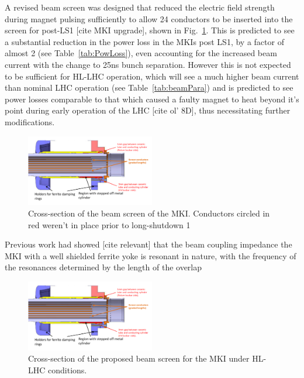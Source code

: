 \documentclass[a4paper,
              ]{jacow}
\begin{document}
A revised beam screen was designed that reduced the electric field strength during magnet pulsing sufficiently to allow 24 conductors to be inserted into the screen for post-LS1 [cite MKI upgrade], shown in Fig.~\ref{fig:BeamScreenPostLS1}. This is predicted to see a substantial reduction in the power loss in the MKIs post LS1, by a factor of almost 2 (see Table~\ref{tab:PowLoss}), even accounting for the increased beam current with the change to 25ns bunch separation. However this is not expected to be sufficient for HL-LHC operation, which will see a much higher beam current than nominal LHC operation (see Table~\ref{tab:beamPara}) and is predicted to see power losses comparable to that which caused a faulty magnet to heat beyond it's point during early operation of the LHC [cite ol' 8D], thus necessitating further modifications.

\begin{figure}
\begin{center}
\includegraphics[width=0.5\textwidth]{beamScreenCrossSectionLabelled.pdf}
\caption{Cross-section of the beam screen of the MKI. Conductors circled in red weren't in place prior to long-shutdown 1}
\label{fig:BeamScreenPostLS1}
\end{center}
\end{figure}

Previous work had showed [cite relevant] that the beam coupling impedance the MKI with a well shielded ferrite yoke is resonant in nature, with the frequency of the resonances determined by the length of the overlap

\begin{figure}
\begin{center}
\includegraphics[width=0.5\textwidth]{beamScreenCrossSectionLabelled.pdf}
\caption{Cross-section of the proposed beam screen for the MKI under HL-LHC conditions.}
\label{fig:BeamScreenHLLHC}
\end{center}
\end{figure}
\end{document}
